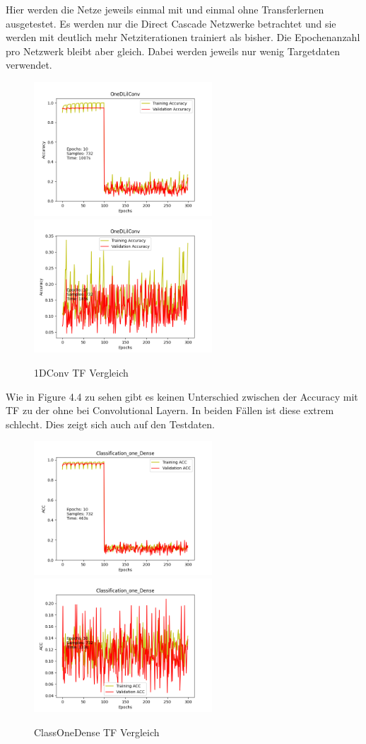 Hier werden die Netze jeweils einmal mit und einmal ohne Transferlernen ausgetestet. Es werden nur die Direct Cascade Netzwerke betrachtet und 
sie werden mit deutlich mehr Netziterationen trainiert als bisher. Die Epochenanzahl pro Netzwerk bleibt aber gleich. Dabei werden jeweils nur 
wenig Targetdaten verwendet. 

\begin{figure}[htpb]
    \includegraphics[height=5cm]{../../Plots/ba_plots/classTF/1dc_tr.png}
    \includegraphics[height=5cm]{../../Plots/ba_plots/classTF/wo1dc_tr.png}
    \caption{\label{fig:1dc_tr} 1DConv TF Vergleich}
\end{figure}

Wie in Figure 4.4 zu sehen gibt es keinen Unterschied zwischen der Accuracy mit TF zu der ohne bei Convolutional Layern. In beiden Fällen ist diese 
extrem schlecht. Dies zeigt sich auch auf den Testdaten. 

\begin{figure}[htpb]
    \includegraphics[height=5cm]{../../Plots/ba_plots/classTF/cod_tr.png}
    \includegraphics[height=5cm]{../../Plots/ba_plots/classTF/wocod_tr.png}
    \caption{\label{fig:cod_tr} ClassOneDense TF Vergleich}
\end{figure}

